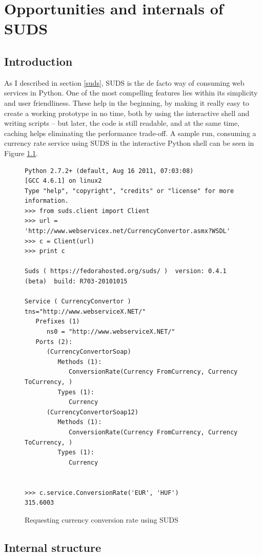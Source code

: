 \chapter{Opportunities and internals of SUDS}

\section{Introduction}

As I described in section \ref{suds}, SUDS is the de facto way of consuming web services in Python. One of the most compelling features lies within its simplicity and user friendliness. These help in the beginning, by making it really easy to create a working prototype in no time, both by using the interactive shell and writing scripts -- but later, the code is still readable, and at the same time, caching helps eliminating the performance trade-off. A sample run, consuming a currency rate service using SUDS in the interactive Python shell can be seen in Figure \ref{fig:suds-currency}.

\begin{figure}[htbp]
 \centering
\begin{lstlisting}[numbers=off, basicstyle=\footnotesize\ttfamily]
Python 2.7.2+ (default, Aug 16 2011, 07:03:08)
[GCC 4.6.1] on linux2
Type "help", "copyright", "credits" or "license" for more information.
>>> from suds.client import Client
>>> url = 'http://www.webservicex.net/CurrencyConvertor.asmx?WSDL'
>>> c = Client(url)
>>> print c

Suds ( https://fedorahosted.org/suds/ )  version: 0.4.1 (beta)  build: R703-20101015

Service ( CurrencyConvertor ) tns="http://www.webserviceX.NET/"
   Prefixes (1)
      ns0 = "http://www.webserviceX.NET/"
   Ports (2):
      (CurrencyConvertorSoap)
         Methods (1):
            ConversionRate(Currency FromCurrency, Currency ToCurrency, )
         Types (1):
            Currency
      (CurrencyConvertorSoap12)
         Methods (1):
            ConversionRate(Currency FromCurrency, Currency ToCurrency, )
         Types (1):
            Currency


>>> c.service.ConversionRate('EUR', 'HUF')
315.6003
\end{lstlisting}
 \caption{Requesting currency conversion rate using SUDS}
 \label{fig:suds-currency}
\end{figure}

\section{Internal structure}


